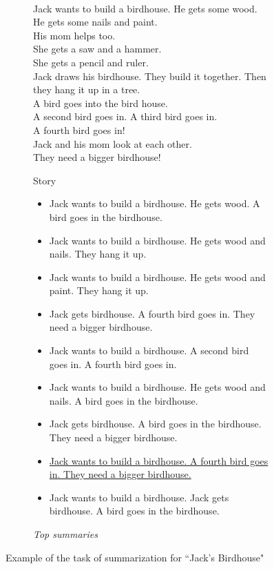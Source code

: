 \begin{figure}[H]\
\begin{subfigure}{\textwidth}
\begin{displayquote}
Jack wants to build a birdhouse. He gets some wood.\\
He gets some nails and paint.\\
His mom helps too.\\
She gets a saw and a hammer.\\
She gets a pencil and ruler.\\
Jack draws his birdhouse. They build it together. Then they hang it up in a tree.\\
A bird goes into the bird house.\\
A second bird goes in. A third bird goes in.\\
A fourth bird goes in!\\
Jack and his mom look at each other.\\
They need a bigger birdhouse!
\end{displayquote}
\caption{Story}
\vspace{\baselineskip}
\end{subfigure}
\begin{subfigure}{\textwidth}
\begin{itemize}[nolistsep]
\item Jack wants to build a birdhouse. He gets wood. A bird goes in the birdhouse.
\item Jack wants to build a birdhouse. He gets wood and nails. They hang it up.
\item Jack wants to build a birdhouse. He gets wood and paint. They hang it up.
\item Jack gets birdhouse. A fourth bird goes in. They need a bigger birdhouse.
\item Jack wants to build a birdhouse. A second bird goes in. A fourth bird goes in.
\item Jack wants to build a birdhouse. He gets wood and nails. A bird goes in the birdhouse.
\item Jack gets birdhouse. A bird goes in the birdhouse. They need a bigger birdhouse.
\item \ul{Jack wants to build a birdhouse. A fourth bird goes in. They need a bigger birdhouse.}
\item Jack wants to build a birdhouse. Jack gets birdhouse. A bird goes in the birdhouse.
\end{itemize}
\vspace{\topsep}
\caption{\textit{Top summaries}}
\end{subfigure}
\caption{Example of the task of summarization for ``Jack's Birdhouse"}
\label{fig:jacks_birdhouse}
\end{figure}
